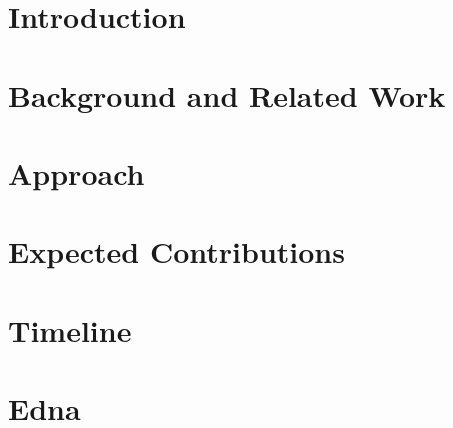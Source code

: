 \documentclass{article}
\author{
    Lillian Tsai\\
    Massachusetts Institute of Technology\\
    \texttt{tsilyai@mit.edu}
}
\date{\mydate}
\title{\mytitle}
\begin{document}


\newpage

\maketitle

\section{Introduction}%


\section{Background and Related Work}%


\section{Approach}%


\section{Expected Contributions}%


\section{Timeline}%


\begin{spacing}{1}
{}

\end{spacing}
%
%

\section{Edna}
\label{s:edna}

\end{document}
